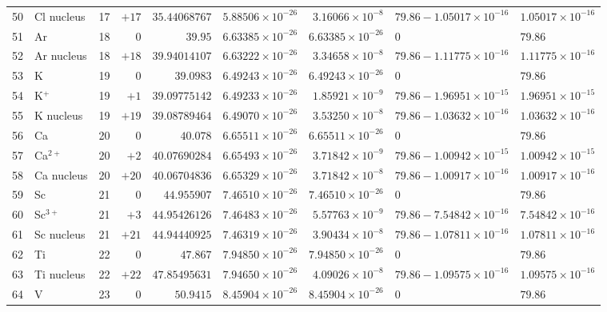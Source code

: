 {\begin{tabular}{@{}r l r r r r r l l@{}}
50 & Cl nucleus & 17 & $+17$ & $35.44068767$ & $5.88506{\times}10^{-26}$ & $3.16066{\times}10^{-8}$ & $79.86 - 1.05017{\times}10^{-16}$ & $1.05017{\times}10^{-16}$ \\
51 & Ar & 18 & $0$ & $39.95$ & $6.63385{\times}10^{-26}$ & $6.63385{\times}10^{-26}$ & $0$ & $79.86$ \\
52 & Ar nucleus & 18 & $+18$ & $39.94014107$ & $6.63222{\times}10^{-26}$ & $3.34658{\times}10^{-8}$ & $79.86 - 1.11775{\times}10^{-16}$ & $1.11775{\times}10^{-16}$ \\
53 & K & 19 & $0$ & $39.0983$ & $6.49243{\times}10^{-26}$ & $6.49243{\times}10^{-26}$ & $0$ & $79.86$ \\
54 & K$^{+}$ & 19 & $+1$ & $39.09775142$ & $6.49233{\times}10^{-26}$ & $1.85921{\times}10^{-9}$ & $79.86 - 1.96951{\times}10^{-15}$ & $1.96951{\times}10^{-15}$ \\
55 & K nucleus & 19 & $+19$ & $39.08789464$ & $6.49070{\times}10^{-26}$ & $3.53250{\times}10^{-8}$ & $79.86 - 1.03632{\times}10^{-16}$ & $1.03632{\times}10^{-16}$ \\
56 & Ca & 20 & $0$ & $40.078$ & $6.65511{\times}10^{-26}$ & $6.65511{\times}10^{-26}$ & $0$ & $79.86$ \\
57 & Ca$^{2+}$ & 20 & $+2$ & $40.07690284$ & $6.65493{\times}10^{-26}$ & $3.71842{\times}10^{-9}$ & $79.86 - 1.00942{\times}10^{-15}$ & $1.00942{\times}10^{-15}$ \\
58 & Ca nucleus & 20 & $+20$ & $40.06704836$ & $6.65329{\times}10^{-26}$ & $3.71842{\times}10^{-8}$ & $79.86 - 1.00917{\times}10^{-16}$ & $1.00917{\times}10^{-16}$ \\
59 & Sc & 21 & $0$ & $44.955907$ & $7.46510{\times}10^{-26}$ & $7.46510{\times}10^{-26}$ & $0$ & $79.86$ \\
60 & Sc$^{3+}$ & 21 & $+3$ & $44.95426126$ & $7.46483{\times}10^{-26}$ & $5.57763{\times}10^{-9}$ & $79.86 - 7.54842{\times}10^{-16}$ & $7.54842{\times}10^{-16}$ \\
61 & Sc nucleus & 21 & $+21$ & $44.94440925$ & $7.46319{\times}10^{-26}$ & $3.90434{\times}10^{-8}$ & $79.86 - 1.07811{\times}10^{-16}$ & $1.07811{\times}10^{-16}$ \\
62 & Ti & 22 & $0$ & $47.867$ & $7.94850{\times}10^{-26}$ & $7.94850{\times}10^{-26}$ & $0$ & $79.86$ \\
63 & Ti nucleus & 22 & $+22$ & $47.85495631$ & $7.94650{\times}10^{-26}$ & $4.09026{\times}10^{-8}$ & $79.86 - 1.09575{\times}10^{-16}$ & $1.09575{\times}10^{-16}$ \\
64 & V & 23 & $0$ & $50.9415$ & $8.45904{\times}10^{-26}$ & $8.45904{\times}10^{-26}$ & $0$ & $79.86$ \\

\end{tabular}}
